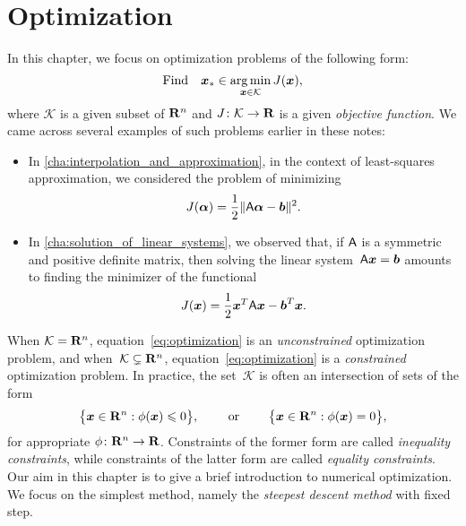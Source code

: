\chapter{Optimization}%
\label{cha:Optimization}

\minitoc

In this chapter, we focus on optimization problems of the following form:
\begin{equation}
    \label{eq:optimization}
    \text{Find} \quad \mathbf{\boldsymbol{x}}_* \in \operatorname*{arg\,min}_{\mathbf{\boldsymbol{x}} \in \mathcal K} J(\mathbf{\boldsymbol{x}}),
\end{equation}
where $\mathcal K$ is a given subset of $\mathbf R^n$ and $J\colon \mathcal K \to \mathbf R$ is a given \emph{objective function}.
We came across several examples of such problems earlier in these notes:
\begin{itemize}
    \item
        In \cref{cha:interpolation_and_approximation},
        in the context of least-squares approximation,
        we considered the problem of minimizing
        \[
            J(\mathbf{\boldsymbol{\alpha}}) = \frac{1}{2} \lVert \mathsf A \mathbf{\boldsymbol{\alpha}} - \mathbf{\boldsymbol{b}} \rVert^2.
        \]

    \item
        In \cref{cha:solution_of_linear_systems},
        we observed that,
        if $\mathsf A$ is a symmetric and positive definite matrix,
        then solving the linear system~$\mathsf A \mathbf{\boldsymbol{x}} = \mathbf{\boldsymbol{b}}$
        amounts to finding the minimizer of the functional
        \[
            J(\mathbf{\boldsymbol{x}})  = \frac{1}{2} \mathbf{\boldsymbol{x}}^T \mathsf A \mathbf{\boldsymbol{x}} - \mathbf{\boldsymbol{b}}^T \mathbf{\boldsymbol{x}}.
        \]
\end{itemize}
When $\mathcal K = \mathbf R^n$,
equation~\eqref{eq:optimization} is an \emph{unconstrained} optimization problem,
and when~$\mathcal K \subsetneq \mathbf R^n$,
equation~\eqref{eq:optimization} is a \emph{constrained} optimization problem.
In practice,
the set~$\mathcal K$ is often an intersection of sets of the form
\[
    \bigl\{ \mathbf{\boldsymbol{x}} \in \mathbf R^n : \phi(\mathbf{\boldsymbol{x}}) \leqslant 0 \bigr\},
    \qquad
    \text{ or }
    \qquad
    \bigl\{ \mathbf{\boldsymbol{x}} \in \mathbf R^n : \phi(\mathbf{\boldsymbol{x}}) = 0 \bigr\},
\]
for appropriate $\phi\colon \mathbf R^n \to \mathbf R$.
Constraints of the former form are called \emph{inequality constraints},
while constraints of the latter form are called \emph{equality constraints}.
Our aim in this chapter is to give a brief introduction to numerical optimization.
We focus on the simplest method,
namely the \emph{steepest descent method} with fixed step.
